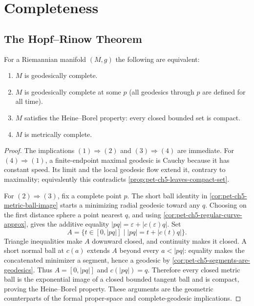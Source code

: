 \section{Completeness}

\subsection{The Hopf–Rinow Theorem}

\begin{theorem}
  \label{thm:pet-ch5-hopf-rinow}
  \leanok
  For a Riemannian manifold $(M,g)$ the following are equivalent:
  \begin{enumerate}
  \item[(1)] $M$ is geodesically complete.
  \item[(2)] $M$ is geodesically complete at some $p$ (all geodesics through $p$
  are defined for all time).
  \item[(3)] $M$ satisfies the Heine–Borel property: every closed bounded set is
  compact.
  \item[(4)] $M$ is metrically complete.
  \end{enumerate}
\end{theorem}
\begin{proof}
  \leanok
  \sketch
  The implications $(1)\Rightarrow(2)$ and $(3)\Rightarrow(4)$ are immediate.
  For $(4)\Rightarrow(1)$, a finite-endpoint maximal geodesic is Cauchy because it
  has constant speed.  Its limit and the local geodesic flow extend it, contrary to
  maximality; equivalently this contradicts
  \cref{prop:pet-ch5-leaves-compact-set}.

  For $(2)\Rightarrow(3)$, fix a complete point $p$.  The short ball identity in
  \cref{cor:pet-ch5-metric-ball-image} starts a minimizing radial geodesic toward
  any $q$.  Choosing on the first distance sphere a point nearest $q$, and using
  \cref{cor:pet-ch5-regular-curve-approx}, gives the additive equality
  $|pq|=\varepsilon+|c(\varepsilon)q|$.  Set
  \[
    A=\{t\in[0,|pq|]\mid |pq|=t+|c(t)q|\}.
  \]
  Triangle inequalities make $A$ downward closed, and continuity makes it closed.
  A short normal ball at $c(a)$ extends $A$ beyond every $a<|pq|$: equality makes
  the concatenated minimizer a segment, hence a geodesic by
  \cref{cor:pet-ch5-segments-are-geodesics}.  Thus $A=[0,|pq|]$ and $c(|pq|)=q$.
  Therefore every closed metric ball is the exponential image of a closed bounded
  tangent ball and is compact, proving the Heine--Borel property.  These arguments
  are the geometric counterparts of the formal proper-space and complete-geodesic
  implications.
\end{proof}

